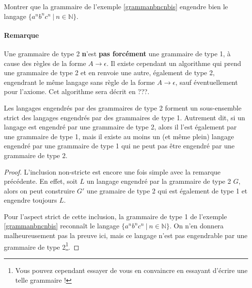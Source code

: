 \begin{exercice}
Montrer que la grammaire de l'exemple \ref{grammanbncnbis} engendre bien le langage $\{a^nb^nc^n ~|~ n \in \mathbb{N}\}$.
\end{exercice}

\paragraph{Remarque} Une grammaire de type 2 \textbf{n}'est \textbf{pas forcément} une grammaire de type 1, à cause des règles de la forme $A \rightarrow \epsilon$. Il existe cependant un algorithme qui prend une grammaire de type 2 et en renvoie une autre, également de type 2, engendrant le même langage sans règle de la forme $A \rightarrow \epsilon$, sauf éventuellement pour l'axiome. Cet algorithme sera décrit en ???. %


\begin{lemma}
Les langages engendrés par des grammaires de type 2 forment un sous-ensemble strict des langages engendrés par des grammaires de type 1. Autrement dit, si un langage est engendré par une grammaire de type 2, alors il l'est également par une grammaire de type 1, mais il existe au moins un (et même plein) langage engendré par une grammaire de type 1 qui ne peut pas être engendré par une grammaire de type 2.  
\end{lemma}

\begin{proof}
L'inclusion non-stricte est encore une fois simple avec la remarque précédente. En effet, soit $L$ un langage engendré par la grammaire de type 2 $G$, alors on peut construire $G'$ une gramaire de type 2 qui est également de type 1 et engendre toujours $L$.

Pour l'aspect strict de cette inclusion, la grammaire de type 1 de l'exemple \ref{grammanbncnbis} reconnaît le langage $\{a^nb^nc^n ~|~ n \in \mathbb{N}\}$. On n'en donnera malheureusement pas la preuve ici, mais ce langage n'est pas engendrable par une grammaire de type 2\footnote{Vous pouvez cependant essayer de vous en convaincre en essayant d'écrire une telle grammaire !}.
\end{proof}